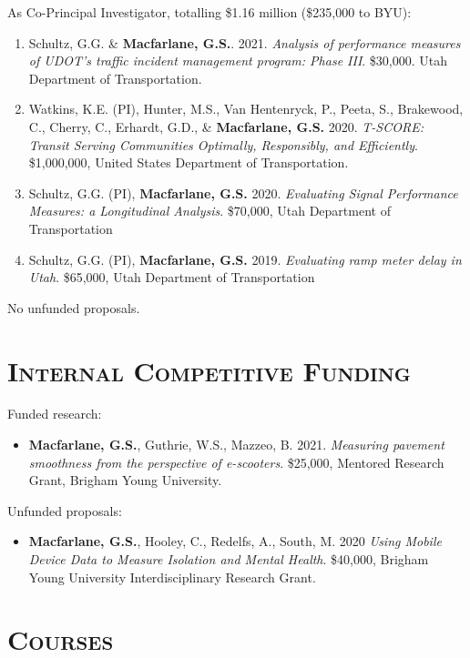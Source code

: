 \documentclass[margin,line]{res}
\newcounter{enuminitialize}
\newenvironment{myenum}[1][]
{%
 \setcounter{enuminitialize}{#1}
 \addtocounter{enuminitialize}{2}
 \begin{enumerate}[left= 4pt, itemsep=12pt, start=\value{enuminitialize}, label=\arabic*\addtocounter{enumi}{-2}]
}
{%
 \end{enumerate}
}
\newcommand{\secfont}{\scshape }
\begin{document}
\begin{resume}
As Co-Principal Investigator, totalling \$1.16 million (\$235,000 to BYU):
\vspace{0.3cm}
\begin{myenum}[4]
  \item{Schultz, G.G. \& \textbf{Macfarlane, G.S.}. 2021. \textit{Analysis of
  performance measures of UDOT’s traffic incident management program: Phase
  III}. \$30,000. Utah Department of Transportation.}
  \item{Watkins, K.E. (PI), Hunter, M.S., Van Hentenryck, P., Peeta, S.,
  Brakewood, C., Cherry, C., Erhardt, G.D., \& \textbf{Macfarlane, G.S.} 2020. \textit{
  T-SCORE: Transit Serving Communities Optimally, Responsibly, and Efficiently}.
  \$1,000,000, United States Department of Transportation.}
  \item{ Schultz, G.G. (PI), \textbf{Macfarlane, G.S.} 2020. \textit{ Evaluating Signal
  Performance Measures: a Longitudinal Analysis}. \$70,000, Utah Department of
  Transportation}
  \item{ Schultz, G.G. (PI), \textbf{Macfarlane, G.S.} 2019. \textit{ Evaluating ramp meter
delay in Utah}. \$65,000, Utah Department of Transportation}
\end{myenum}

No unfunded proposals.

\section{\secfont{Internal Competitive Funding}}
Funded research:
\begin{itemize}
  \item {\textbf{Macfarlane, G.S.}, Guthrie, W.S., Mazzeo, B. 2021. \textit{ Measuring pavement smoothness from the perspective of e-scooters}. \$25,000, Mentored Research Grant, Brigham Young University.}
\end{itemize}

Unfunded proposals:
\begin{itemize}
  \item{\textbf{Macfarlane, G.S.}, Hooley, C., Redelfs, A., South, M. 2020 \textit{ Using Mobile Device Data to Measure Isolation and Mental Health}}.
  \$40,000, Brigham Young University Interdisciplinary Research Grant.
\end{itemize}

\noindent\makebox[\linewidth]{\rule{\linewidth}{0.4pt}}
\section{\secfont Courses}


\end{resume}
\end{document}

